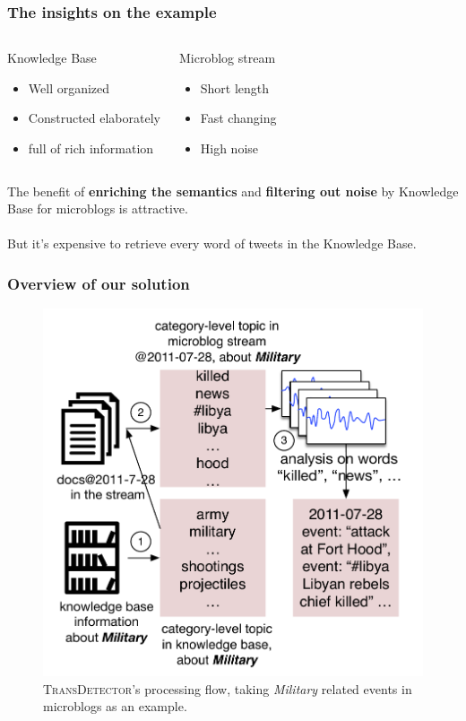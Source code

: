 \documentclass{beamer}
\begin{document}
\begin{frame}
\frametitle{The insights on the example}	
\begin{columns}[onlytextwidth, t]
    \begin{tcolorbox}[colback=red!5,colframe=red!5]
    Knowledge Base
        \begin{itemize}
            \item Well organized
            \item Constructed elaborately
            \item full of rich information
        \end{itemize}
    \end{tcolorbox}

    \begin{tcolorbox}[colback=red!5,colframe=red!5]
    Microblog stream
        \begin{itemize}
            \item Short length
            \item Fast changing
            \item High noise
        \end{itemize}
    \end{tcolorbox}
\end{columns}

\begin{tcolorbox}[colback=red!5,colframe=red!75!black]
The benefit of \textbf{enriching the semantics} and \textbf{filtering out noise} by Knowledge Base for microblogs is attractive.
\\~\\
But it's expensive to retrieve every word of tweets in the Knowledge Base.
\end{tcolorbox}


\end{frame}


\begin{frame}
\frametitle{Overview of our solution}	

\begin{figure}[h]
		\setlength{\abovecaptionskip}{0.cm}
        \setlength{\belowcaptionskip}{0.cm}
        \centering
        \includegraphics[width=0.5\columnwidth]{../img/NSDetectorExample.pdf}
        \caption{\textsc{TransDetector}'s processing flow, taking \textit{Military} related events in microblogs as an example.}
        \label{fig:hood}
\end{figure}


\end{frame}
\end{document}

